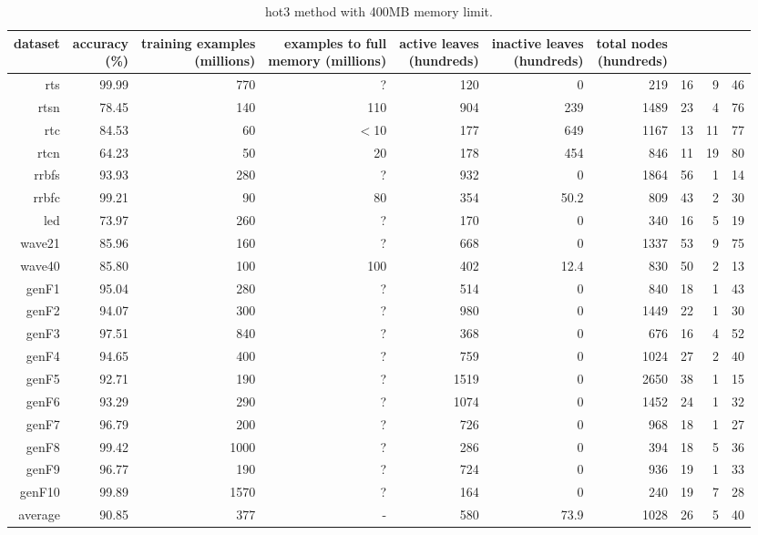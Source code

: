 \clearpage
\begin{table}
\caption{{\sc hot3} method with 400MB memory limit.}
\label{tab:hot3-400MB}
\centering
\begin{tabular}{|r|r|r|r|r|r|r|r|r|r|}
\hline
dataset	&
\rotatebox{90}{\parbox{9em}{accuracy\\(\%)}} &
\rotatebox{90}{\parbox{9em}{training examples\\(millions)}} &
\rotatebox{90}{\parbox{9em}{examples to full\\memory (millions)}} &
\rotatebox{90}{\parbox{9em}{active leaves\\(hundreds)}} &
\rotatebox{90}{\parbox{9em}{inactive leaves\\(hundreds)}} &
\rotatebox{90}{\parbox{9em}{total nodes\\(hundreds)}} &
\rotatebox{90}{\parbox{9em}{tree depth}}	&
\rotatebox{90}{\parbox{9em}{training speed (\%)}} &
\rotatebox{90}{\parbox{9em}{prediction speed (\%)}} \\
\hline
{\sc rts} & 99.99 & 770 & ? & 120 & 0 & 219 & 16 & 9 & 46 \\
{\sc rtsn} & 78.45 & 140 & 110 & 904 & 239 & 1489 & 23 & 4 & 76 \\
{\sc rtc} & 84.53 & 60 & $<$10 & 177 & 649 & 1167 & 13 & 11 & 77 \\
{\sc rtcn} & 64.23 & 50 & 20 & 178 & 454 & 846 & 11 & 19 & 80 \\
{\sc rrbfs} & 93.93 & 280 & ? & 932 & 0 & 1864 & 56 & 1 & 14 \\
{\sc rrbfc} & 99.21 & 90 & 80 & 354 & 50.2 & 809 & 43 & 2 & 30 \\
{\sc led} & 73.97 & 260 & ? & 170 & 0 & 340 & 16 & 5 & 19 \\
{\sc wave21} & 85.96 & 160 & ? & 668 & 0 & 1337 & 53 & 9 & 75 \\
{\sc wave40} & 85.80 & 100 & 100 & 402 & 12.4 & 830 & 50 & 2 & 13 \\
{\sc genF1} & 95.04 & 280 & ? & 514 & 0 & 840 & 18 & 1 & 43 \\
{\sc genF2} & 94.07 & 300 & ? & 980 & 0 & 1449 & 22 & 1 & 30 \\
{\sc genF3} & 97.51 & 840 & ? & 368 & 0 & 676 & 16 & 4 & 52 \\
{\sc genF4} & 94.65 & 400 & ? & 759 & 0 & 1024 & 27 & 2 & 40 \\
{\sc genF5} & 92.71 & 190 & ? & 1519 & 0 & 2650 & 38 & 1 & 15 \\
{\sc genF6} & 93.29 & 290 & ? & 1074 & 0 & 1452 & 24 & 1 & 32 \\
{\sc genF7} & 96.79 & 200 & ? & 726 & 0 & 968 & 18 & 1 & 27 \\
{\sc genF8} & 99.42 & 1000 & ? & 286 & 0 & 394 & 18 & 5 & 36 \\
{\sc genF9} & 96.77 & 190 & ? & 724 & 0 & 936 & 19 & 1 & 33 \\
{\sc genF10} & 99.89 & 1570 & ? & 164 & 0 & 240 & 19 & 7 & 28 \\
\hline
average & 90.85 & 377 &  -  & 580 & 73.9 & 1028 & 26 & 5 & 40 \\
\hline
\end{tabular}
\end{table}
